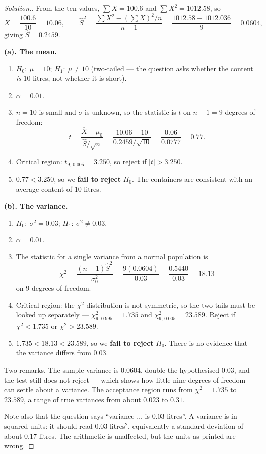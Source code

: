\documentclass[11pt,a4paper]{article}
\theoremstyle{definition}
\newenvironment{solution}
  {\renewcommand{\qedsymbol}{}\begin{proof}[\textit{Solution}.]}
  {\end{proof}}
\begin{document}
\begin{solution}
From the ten values, $\sum X=100.6$ and $\sum X^2=1012.58$, so
\[\overline{X}=\frac{100.6}{10}=10.06,\qquad
\hat{S}^2=\frac{\sum X^2-(\sum X)^2/n}{n-1}=\frac{1012.58-1012.036}{9}=0.0604,\]
giving $\hat{S}=0.2459$.

\textbf{(a). The mean.}
\begin{enumerate}
\item $H_0:\ \mu=10$; $H_1:\ \mu\neq 10$ (two-tailed --- the question asks whether the
content \emph{is} $10$ litres, not whether it is short).
\item $\alpha=0.01$.
\item $n=10$ is small and $\sigma$ is unknown, so the statistic is $t$ on $n-1=9$ degrees of
freedom:
\[t=\frac{\overline{X}-\mu_0}{\hat{S}/\sqrt{n}}
=\frac{10.06-10}{0.2459/\sqrt{10}}=\frac{0.06}{0.0777}=0.77.\]
\item Critical region: $t_{9,\,0.005}=3.250$, so reject if $|t|>3.250$.
\item $0.77<3.250$, so we \textbf{fail to reject} $H_0$. The containers are consistent with
an average content of $10$ litres.
\end{enumerate}

\textbf{(b). The variance.}
\begin{enumerate}
\item $H_0:\ \sigma^2=0.03$; $H_1:\ \sigma^2\neq 0.03$.
\item $\alpha=0.01$.
\item The statistic for a single variance from a normal population is
\[\chi^2=\frac{(n-1)\hat{S}^2}{\sigma_0^2}=\frac{9(0.0604)}{0.03}
=\frac{0.5440}{0.03}=18.13\]
on $9$ degrees of freedom.
\item Critical region: the $\chi^2$ distribution is not symmetric, so the two tails must be
looked up separately --- $\chi^2_{9,\,0.995}=1.735$ and $\chi^2_{9,\,0.005}=23.589$. Reject
if $\chi^2<1.735$ or $\chi^2>23.589$.
\item $1.735<18.13<23.589$, so we \textbf{fail to reject} $H_0$. There is no evidence that
the variance differs from $0.03$.
\end{enumerate}

Two remarks. The sample variance is $0.0604$, double the hypothesised $0.03$, and the test
still does not reject --- which shows how little nine degrees of freedom can settle about a
variance. The acceptance region runs from $\chi^2=1.735$ to $23.589$, a range of true
variances from about $0.023$ to $0.31$.

Note also that the question says ``variance $\ldots$ is $0.03$ litres''. A variance is in
squared units: it should read $0.03$ litres$^2$, equivalently a standard deviation of about
$0.17$ litres. The arithmetic is unaffected, but the units as printed are wrong.
\end{solution}
\end{document}
